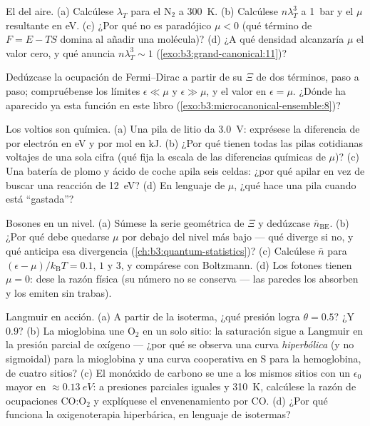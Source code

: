 \begin{exercise}[$\star$]\label{exo:b3:grand-canonical:2}
El  del aire. (a) Calcúlese $\lambda_T$ para el N$_2$
a \qty{300}{K}. (b) Calcúlese $n\lambda_T^3$ a \qty{1}{bar} y
el $\mu$ resultante en eV. (c) ¿Por qué no es paradójico $\mu < 0$
(qué término de $F = E - TS$ domina al añadir una molécula)? (d)
¿A qué densidad alcanzaría $\mu$ el valor cero, y qué anuncia
$n\lambda_T^3 \sim 1$
(\cref{exo:b3:grand-canonical:11})?
\end{exercise}

\begin{exercise}[$\star$]\label{exo:b3:grand-canonical:3}
Dedúzcase la ocupación de Fermi--Dirac a partir de su $\Xi$ de dos términos,
paso a paso; compruébense los límites $\epsilon \ll \mu$ y $\epsilon \gg
\mu$, y el valor en $\epsilon = \mu$. ¿Dónde ha aparecido ya esta función
en este libro
(\cref{exo:b3:microcanonical-ensemble:8})?
\end{exercise}

\begin{exercise}[$\star$]\label{exo:b3:grand-canonical:4}
Los voltios son química. (a) Una pila de litio da \qty{3.0}{V}:
exprésese la diferencia de  por electrón en eV y
por mol en kJ. (b) ¿Por qué tienen todas las pilas cotidianas voltajes de
una sola cifra (qué fija la escala de las diferencias químicas de $\mu$)? (c) Una
batería de plomo y ácido de coche apila seis celdas: ¿por qué apilar en vez
de buscar una reacción de \qty{12}{eV}? (d) En lenguaje de $\mu$, ¿qué hace
una pila cuando está ``gastada''?
\end{exercise}

\begin{exercise}[$\star\star$]\label{exo:b3:grand-canonical:5}
Bosones en un nivel. (a) Súmese la serie geométrica de $\Xi$ y
dedúzcase $\bar n_{\text{BE}}$. (b) ¿Por qué debe quedarse $\mu$ por debajo
del nivel más bajo --- qué diverge si no, y qué anticipa esa
divergencia (\cref{ch:b3:quantum-statistics})? (c)
Calcúlese $\bar n$ para $(\epsilon - \mu)/k_{\text{B}}T = 0.1$, $1$ y
$3$, y compárese con Boltzmann. (d) Los fotones tienen $\mu = 0$: dese
la razón física (su número no se conserva --- las paredes los absorben y los
emiten sin trabas).
\end{exercise}

\begin{exercise}[$\star\star$]\label{exo:b3:grand-canonical:6}
Langmuir en acción. (a) A partir de la isoterma, ¿qué presión logra
$\theta = 0.5$? ¿Y $0.9$? (b) La mioglobina une O$_2$ en un solo sitio:
la saturación sigue a Langmuir en la presión parcial de oxígeno ---
¿por qué se observa una curva \emph{hiperbólica} (y no sigmoidal) para la
mioglobina y una curva cooperativa en S para la hemoglobina, de cuatro
sitios? (c) El monóxido de carbono se une a los mismos sitios con un
$\epsilon_0$ mayor en $\approx\qty{0.13}{eV}$: a presiones parciales iguales
y \qty{310}{K}, calcúlese la razón de ocupaciones CO:O$_2$ y explíquese el
envenenamiento por CO. (d) ¿Por qué funciona la oxigenoterapia hiperbárica,
en lenguaje de isotermas?
\end{exercise}

